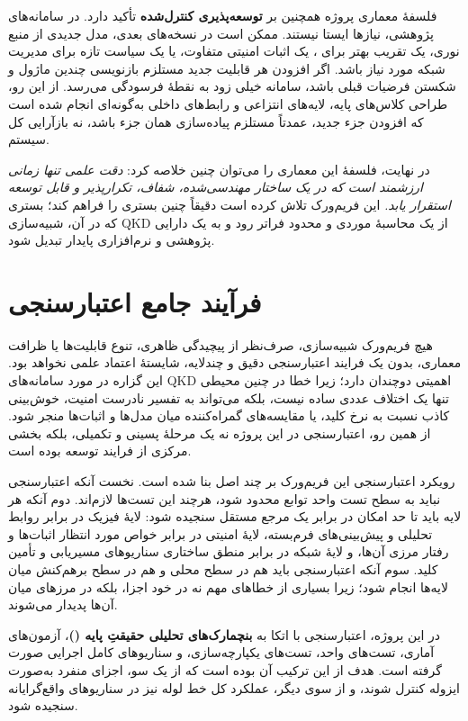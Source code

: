 \begin{sloppypar}
فلسفهٔ معماری پروژه همچنین بر \textbf{توسعه‌پذیری کنترل‌شده} تأکید دارد. در سامانه‌های پژوهشی، نیازها ایستا نیستند. ممکن است در نسخه‌های بعدی، مدل جدیدی از منبع نوری، یک تقریب بهتر برای ، یک اثبات امنیتی متفاوت، یا یک سیاست تازه برای مدیریت شبکه مورد نیاز باشد. اگر افزودن هر قابلیت جدید مستلزم بازنویسی چندین ماژول و شکستن فرضیات قبلی باشد، سامانه خیلی زود به نقطهٔ فرسودگی می‌رسد. از این رو، طراحی کلاس‌های پایه، لایه‌های انتزاعی و رابط‌های داخلی به‌گونه‌ای انجام شده است که افزودن جزء جدید، عمدتاً مستلزم پیاده‌سازی همان جزء باشد، نه بازآرایی کل سیستم.

در نهایت، فلسفهٔ این معماری را می‌توان چنین خلاصه کرد: \textit{دقت علمی تنها زمانی ارزشمند است که در یک ساختار مهندسی‌شده، شفاف، تکرارپذیر و قابل توسعه استقرار یابد.} این فریم‌ورک تلاش کرده است دقیقاً چنین بستری را فراهم کند؛ بستری که در آن، شبیه‌سازی QKD از یک محاسبهٔ موردی و محدود فراتر رود و به یک دارایی پژوهشی و نرم‌افزاری پایدار تبدیل شود.

\section*{فرآیند جامع اعتبارسنجی}

هیچ فریم‌ورک شبیه‌سازی، صرف‌نظر از پیچیدگی ظاهری، تنوع قابلیت‌ها یا ظرافت معماری، بدون یک فرایند اعتبارسنجی دقیق و چندلایه، شایستهٔ اعتماد علمی نخواهد بود. این گزاره در مورد سامانه‌های QKD اهمیتی دوچندان دارد؛ زیرا خطا در چنین محیطی تنها یک اختلاف عددی ساده نیست، بلکه می‌تواند به تفسیر نادرست امنیت، خوش‌بینی کاذب نسبت به نرخ کلید، یا مقایسه‌های گمراه‌کننده میان مدل‌ها و اثبات‌ها منجر شود. از همین رو، اعتبارسنجی در این پروژه نه یک مرحلهٔ پسینی و تکمیلی، بلکه بخشی مرکزی از فرایند توسعه بوده است.

رویکرد اعتبارسنجی این فریم‌ورک بر چند اصل بنا شده است. نخست آنکه اعتبارسنجی نباید به سطح تست واحد توابع محدود شود، هرچند این تست‌ها لازم‌اند. دوم آنکه هر لایه باید تا حد امکان در برابر یک مرجع مستقل سنجیده شود: لایهٔ فیزیک در برابر روابط تحلیلی و پیش‌بینی‌های فرم‌بسته، لایهٔ امنیتی در برابر خواص مورد انتظار اثبات‌ها و رفتار مرزی آن‌ها، و لایهٔ شبکه در برابر منطق ساختاری سناریوهای مسیریابی و تأمین کلید. سوم آنکه اعتبارسنجی باید هم در سطح محلی و هم در سطح برهم‌کنش میان لایه‌ها انجام شود؛ زیرا بسیاری از خطاهای مهم نه در خود اجزا، بلکه در مرزهای میان آن‌ها پدیدار می‌شوند.

در این پروژه، اعتبارسنجی با اتکا به \textbf{بنچمارک‌های تحلیلی حقیقتِ پایه ()}، آزمون‌های آماری، تست‌های واحد، تست‌های یکپارچه‌سازی، و سناریوهای کامل اجرایی صورت گرفته است. هدف از این ترکیب آن بوده است که از یک سو، اجزای منفرد به‌صورت ایزوله کنترل شوند، و از سوی دیگر، عملکرد کل خط لوله نیز در سناریوهای واقع‌گرایانه سنجیده شود.


\end{sloppypar}

